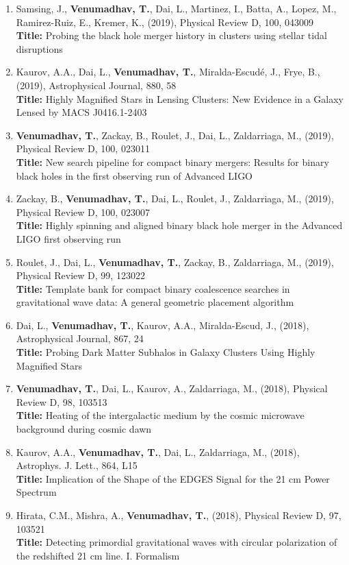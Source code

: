 \documentclass{article}
\newcommand{\apj}{Astrophysical Journal}
\newcommand{\apjl}{Astrophys. J. Lett.}
\newcommand{\prd}{Physical Review D}
\begin{document}
{\begin{enumerate}[leftmargin=*,itemsep=0.45em,topsep=0.35em]
\item Samsing, J., \textbf{Venumadhav, T.}, Dai, L., Martinez, I., Batta, A., Lopez, M., Ramirez-Ruiz, E., Kremer, K., (2019), \prd, 100, 043009 \\
\textbf{Title:} Probing the black hole merger history in clusters using stellar tidal disruptions
\item Kaurov, A.A., Dai, L., \textbf{Venumadhav, T.}, Miralda-Escudé, J., Frye, B., (2019), \apj, 880, 58 \\
\textbf{Title:} Highly Magnified Stars in Lensing Clusters: New Evidence in a Galaxy Lensed by MACS J0416.1-2403
\item \textbf{Venumadhav, T.}, Zackay, B., Roulet, J., Dai, L., Zaldarriaga, M., (2019), \prd, 100, 023011 \\
\textbf{Title:} New search pipeline for compact binary mergers: Results for binary black holes in the first observing run of Advanced LIGO
\item Zackay, B., \textbf{Venumadhav, T.}, Dai, L., Roulet, J., Zaldarriaga, M., (2019), \prd, 100, 023007 \\
\textbf{Title:} Highly spinning and aligned binary black hole merger in the Advanced LIGO first observing run
\item Roulet, J., Dai, L., \textbf{Venumadhav, T.}, Zackay, B., Zaldarriaga, M., (2019), \prd, 99, 123022 \\
\textbf{Title:} Template bank for compact binary coalescence searches in gravitational wave data: A general geometric placement algorithm
\item Dai, L., \textbf{Venumadhav, T.}, Kaurov, A.A., Miralda-Escud, J., (2018), \apj, 867, 24 \\
\textbf{Title:} Probing Dark Matter Subhalos in Galaxy Clusters Using Highly Magnified Stars
\item \textbf{Venumadhav, T.}, Dai, L., Kaurov, A., Zaldarriaga, M., (2018), \prd, 98, 103513 \\
\textbf{Title:} Heating of the intergalactic medium by the cosmic microwave background during cosmic dawn
\item Kaurov, A.A., \textbf{Venumadhav, T.}, Dai, L., Zaldarriaga, M., (2018), \apjl, 864, L15 \\
\textbf{Title:} Implication of the Shape of the EDGES Signal for the 21 cm Power Spectrum
\item Hirata, C.M., Mishra, A., \textbf{Venumadhav, T.}, (2018), \prd, 97, 103521 \\
\textbf{Title:} Detecting primordial gravitational waves with circular polarization of the redshifted 21 cm line. I. Formalism

\end{enumerate}}
\end{document}
